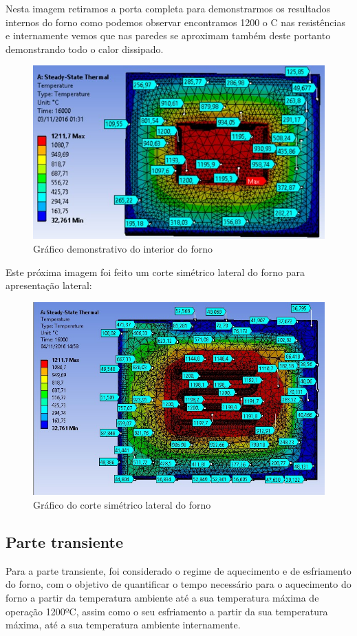 Nesta imagem retiramos a porta completa para demonstrarmos os resultados internos do
forno como podemos observar encontramos 1200 o C nas resistências e internamente vemos que nas
paredes se aproximam também deste portanto demonstrando todo o calor dissipado.
\begin{figure}[H]
	\centering
	\label{ansys18}
	\includegraphics[keepaspectratio=true,scale=1.0]{figuras/ansys18.jpg}
    \caption{Gráfico demonstrativo do interior do forno}
\end{figure}

Este próxima imagem foi feito um corte simétrico lateral do forno para apresentação lateral:
\begin{figure}[H]
	\centering
	\label{ansys19}
	\includegraphics[keepaspectratio=true,scale=0.8]{figuras/ansys19.jpg}
    \caption{Gráfico do corte simétrico lateral do forno}
\end{figure}

\subsection{Parte transiente}
Para a parte transiente, foi considerado o regime de aquecimento e de esfriamento
do forno, com o objetivo de quantificar o tempo necessário para o aquecimento do forno a
partir da temperatura ambiente até a sua temperatura máxima de operação 1200ºC, assim
como o seu esfriamento a partir da sua temperatura máxima, até a sua temperatura
ambiente internamente.

